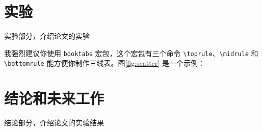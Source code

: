 \documentclass[lang=cn,11pt]{elegantpaper}
\begin{document}
\section{实验}
实验部分，介绍论文的实验

我强烈建议你使用 \lstinline{booktabs} 宏包，这个宏包有三个命令 \lstinline{\toprule}、\lstinline{\midrule} 和 \lstinline{\bottomrule} 能方便你制作三线表。图\ref{fig:scatter} 是一个示例：



\section{结论和未来工作}
结论部分，介绍论文的实验结果




\end{document}
